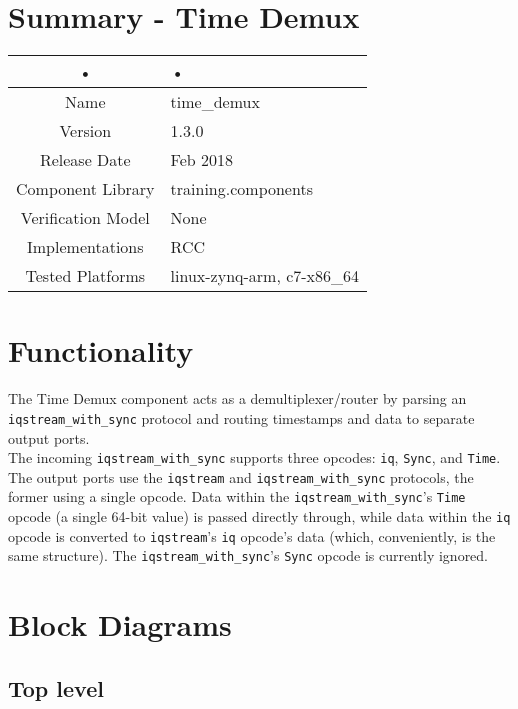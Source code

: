 \documentclass{article}
\begin{document}
\section*{Summary - Time Demux}
	\begin{tabular}{|c|M{13.5cm}|}
		\hline
		• & • \\
		\hline
		Name & time\_demux \\
		\hline
		Version & 1.3.0 \\
		\hline
		Release Date & Feb 2018 \\
		\hline
		Component Library & training.components \\
		\hline
		Verification Model & None \\
		\hline
		Implementations & RCC \\
		\hline
		Tested Platforms & linux-zynq-arm, c7-x86\_64 \\
		\hline
	\end{tabular}

\section*{Functionality}
The Time Demux component acts as a demultiplexer/router by parsing an \verb+iqstream_with_sync+ protocol and routing timestamps and data to separate output ports.\\
\break
The incoming \verb+iqstream_with_sync+ supports three opcodes: \verb+iq+, \verb+Sync+, and \verb+Time+. The output ports use the \verb+iqstream+ and \verb+iqstream_with_sync+ protocols, the former using a single opcode. Data within the \verb+iqstream_with_sync+'s \verb+Time+ opcode (a single 64-bit value) is passed directly through, while data within the \verb+iq+ opcode is converted to \verb+iqstream+'s \verb+iq+ opcode's data (which, conveniently, is the same structure). The \verb+iqstream_with_sync+'s \verb+Sync+ opcode is currently ignored.\\

\section*{Block Diagrams}
	\subsection*{Top level}
\begin{center}
    \label{fig:block_diagram}
\end{center}
\end{document}
